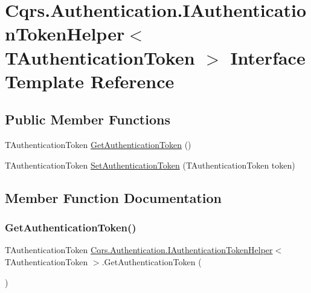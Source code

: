 \hypertarget{interfaceCqrs_1_1Authentication_1_1IAuthenticationTokenHelper}{}\section{Cqrs.\+Authentication.\+I\+Authentication\+Token\+Helper$<$ T\+Authentication\+Token $>$ Interface Template Reference}
\label{interfaceCqrs_1_1Authentication_1_1IAuthenticationTokenHelper}
\subsection*{Public Member Functions}
\begin{DoxyCompactItemize}
\item 
T\+Authentication\+Token \hyperlink{interfaceCqrs_1_1Authentication_1_1IAuthenticationTokenHelper_a4ccb928b5a6880921226508d36d4afc8}{Get\+Authentication\+Token} ()
\item 
T\+Authentication\+Token \hyperlink{interfaceCqrs_1_1Authentication_1_1IAuthenticationTokenHelper_a1af9409257b2d8086be6dfae4edf37fb}{Set\+Authentication\+Token} (T\+Authentication\+Token token)
\end{DoxyCompactItemize}


\subsection{Member Function Documentation}
\mbox{\label{interfaceCqrs_1_1Authentication_1_1IAuthenticationTokenHelper_a4ccb928b5a6880921226508d36d4afc8}} 
\subsubsection{\texorpdfstring{Get\+Authentication\+Token()}{GetAuthenticationToken()}}
{\footnotesize\ttfamily T\+Authentication\+Token \hyperlink{interfaceCqrs_1_1Authentication_1_1IAuthenticationTokenHelper}{Cqrs.\+Authentication.\+I\+Authentication\+Token\+Helper}$<$ T\+Authentication\+Token $>$.Get\+Authentication\+Token (\begin{DoxyParamCaption}{ }\end{DoxyParamCaption})}

